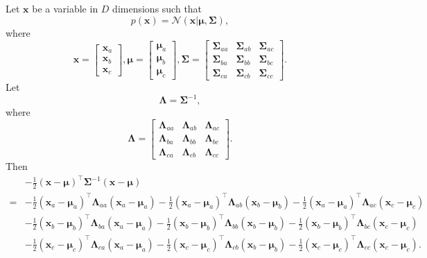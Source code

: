 \subsection{}
\label{2.25}
Let $\mathbf{x}$ be a variable in $D$ dimensions such that
%
\begin{equation}
p(\mathbf{x})
= 
\mathcal{N}(\mathbf{x} | \bm{\mu}, \bm{\Sigma}),
\end{equation}
%
where
%
\[
\mathbf{x}
=
\begin{bmatrix}
\mathbf{x}_a \\
\mathbf{x}_b \\
\mathbf{x}_c
\end{bmatrix}
,
\bm{\mu}
=
\begin{bmatrix}
\bm{\mu}_a \\
\bm{\mu}_b \\
\bm{\mu}_c
\end{bmatrix}
,
\bm{\Sigma}
=
\begin{bmatrix}
\bm{\Sigma}_{aa} & \bm{\Sigma}_{ab} & \bm{\Sigma}_{ac} \\
\bm{\Sigma}_{ba} & \bm{\Sigma}_{bb} & \bm{\Sigma}_{bc} \\
\bm{\Sigma}_{ca} & \bm{\Sigma}_{cb} & \bm{\Sigma}_{cc}
\end{bmatrix}
.
\]
%
Let
%
\begin{equation}
\bm{\Lambda}
= \bm{\Sigma} ^ {-1},
\end{equation}
%
where 
\[
\bm{\Lambda}
=
\begin{bmatrix}
\bm{\Lambda}_{aa} & \bm{\Lambda}_{ab} & \bm{\Lambda}_{ac} \\
\bm{\Lambda}_{ba} & \bm{\Lambda}_{bb} & \bm{\Lambda}_{bc} \\
\bm{\Lambda}_{ca} & \bm{\Lambda}_{cb} & \bm{\Lambda}_{cc}
\end{bmatrix}
.
\]
Then
%
\begin{equation}
\begin{aligned}
&
- 
\frac{1}{2} 
(\mathbf{x} - \bm{\mu}) ^ \intercal 
\bm{\Sigma} ^ {- 1} 
(\mathbf{x} - \bm{\mu}) 
\\
=& 
- 
\frac{1}{2} 
(\mathbf{x}_a - \bm{\mu}_a) ^ \intercal 
\bm{\Lambda}_{aa} 
(\mathbf{x}_a - \bm{\mu}_a)
- 
\frac{1}{2} 
(\mathbf{x}_a - \bm{\mu}_a) ^ \intercal 
\bm{\Lambda}_{ab} 
(\mathbf{x}_b - \bm{\mu}_b)
- 
\frac{1}{2} 
(\mathbf{x}_a - \bm{\mu}_a) ^ \intercal 
\bm{\Lambda}_{ac} 
(\mathbf{x}_c - \bm{\mu}_c) 
\\
& 
- 
\frac{1}{2} 
(\mathbf{x}_b - \bm{\mu}_b) ^ \intercal 
\bm{\Lambda}_{ba} 
(\mathbf{x}_a - \bm{\mu}_a)
- 
\frac{1}{2} 
(\mathbf{x}_b - \bm{\mu}_b) ^ \intercal 
\bm{\Lambda}_{bb} 
(\mathbf{x}_b - \bm{\mu}_b)
- 
\frac{1}{2} 
(\mathbf{x}_b - \bm{\mu}_b) ^ \intercal 
\bm{\Lambda}_{bc} 
(\mathbf{x}_c - \bm{\mu}_c) 
\\
& 
- 
\frac{1}{2} 
(\mathbf{x}_c - \bm{\mu}_c) ^ \intercal 
\bm{\Lambda}_{ca} 
(\mathbf{x}_a - \bm{\mu}_a)
- 
\frac{1}{2} 
(\mathbf{x}_c - \bm{\mu}_c) ^ \intercal 
\bm{\Lambda}_{cb} 
(\mathbf{x}_b - \bm{\mu}_b)
- 
\frac{1}{2} 
(\mathbf{x}_c - \bm{\mu}_c) ^ \intercal 
\bm{\Lambda}_{cc} 
(\mathbf{x}_c - \bm{\mu}_c).
\end{aligned} 
\end{equation}
